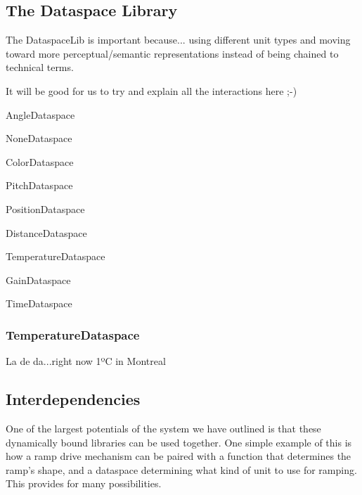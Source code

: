 \documentclass{article}
\newenvironment{packed_item}{
\begin{itemize}
  \setlength{\itemsep}{1pt}
  \setlength{\parskip}{0pt}
  \setlength{\parsep}{0pt}
}{\end{itemize}}
\begin{document}


\subsection{The Dataspace Library} %
\label{sec:dataspacelib}
The DataspaceLib is important because...
using different unit types and moving toward more perceptual/semantic representations instead of being chained to technical terms.



It will be good for us to try and explain all the interactions here ;-) 
\begin{packed_item}
	\item AngleDataspace
	\item NoneDataspace
	\item ColorDataspace
	\item PitchDataspace
	\item PositionDataspace
	\item DistanceDataspace
    \item TemperatureDataspace
    \item GainDataspace
	\item TimeDataspace
\end{packed_item}
	


\subsubsection{TemperatureDataspace}\label{subsec:temperature_dataspace}

La de da...right now 1ºC in Montreal %



\subsection{Interdependencies}\label{sec:interdependencies}

One of the largest potentials of the system we have outlined is that these dynamically bound libraries can be used together. One simple example of this is how a ramp drive mechanism can be paired with a function that determines the ramp's shape, and a dataspace determining what kind of unit to use for ramping.  This provides for many possibilities.
\end{document}
